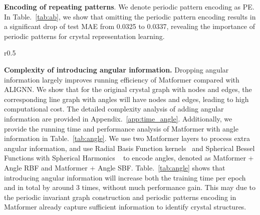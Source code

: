 \documentclass{article}
\begin{document}
\textbf{Encoding of repeating patterns}. We denote periodic pattern encoding as PE. In Table.~\ref{tab:ab}, we show that omitting the periodic pattern encoding results in a significant drop of test MAE from 0.0325 to 0.0337, revealing the importance of periodic patterns for crystal representation learning.

\begin{wraptable}[8]{r}{0.5\textwidth}
\vspace{-15 pt}
\begin{center}
\caption{Ablation studies on angular information. We show the training time per epoch, total training time, and test MAE.}
\vspace{-5pt}
\label{tab:angle}
\end{center}
\end{wraptable}
\textbf{Complexity of introducing angular information.} Dropping angular information largely improves running efficiency of Matformer compared with ALIGNN. We show that for the original crystal graph with  nodes and  edges, the corresponding line graph with angles will have  nodes and  edges, leading to high computational cost.
The detailed complexity analysis of adding angular information are provided in Appendix.~\ref{app:time_angle}. 
Additionally, we provide the running time and performance analysis of Matformer with angle information in Table.~\ref{tab:angle}. We use two Matformer layers to process extra angular information, and use Radial Basis Function kernels~\citep{alignn} and Spherical Bessel Functions with Spherical Harmonics ~\citep{Dimenet, liu2021spherical,klicpera2021gemnet} to encode angles, denoted as Matformer + Angle RBF and Matformer + Angle SBF. Table.~\ref{tab:angle} shows that introducing angular information will increase both the training time per epoch and in total by around 3 times, without much performance gain. This may due to the periodic invariant graph construction and periodic patterns encoding in Matformer already capture sufficient information to identify crystal structures.
\end{document}
